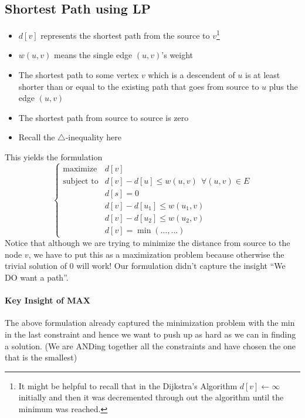\documentclass[10pt]{article}
\begin{document}
\subsection{Shortest Path using LP}
\begin{itemize}
    \item $d[v]$ represents the shortest path from the source to $v$\footnote{It might be helpful to recall that in the Dijkstra's Algorithm $d[v]\gets \infty$ initially and then it was decremented through out the algorithm until the minimum was reached.} 
    \item $w(u,v)$ means the single edge $(u,v)$'s weight
    \item The shortest path to some vertex $v$ which is a descendent of $u$ is at least shorter than or equal to the existing path that goes from source to $u$ plus the edge $(u,v)$
    \item The shortest path from source to source is zero
    \item Recall the $\triangle$-inequality here
\end{itemize}
This yields the formulation
\begin{equation*}
    \begin{cases}
        \text{maximize} &d[v] \\
        \text{subject to} &d[v] - d[u] \leq w(u,v)~~\forall (u,v) \in E \\
        &d[s] = 0 \\
        &d[v] - d[u_1] \leq w(u_1, v) \\
        &d[v] - d[u_2] \leq w(u_2, v) \\
        &d[v] = \min(\dots,\dots)
    \end{cases}
\end{equation*}
Notice that although we are trying to minimize the distance from source to the node $v$, we have to put this as a maximization problem because otherwise the trivial solution of $0$ will work! Our formulation didn't capture the insight ``We DO want a path''.

\paragraph{Key Insight of MAX} The above formulation already captured the minimization problem with the min in the last constraint and hence we want to push up as hard as we can in finding a solution. (We are ANDing together all the constraints and have chosen the one that is the smallest)
\end{document}
